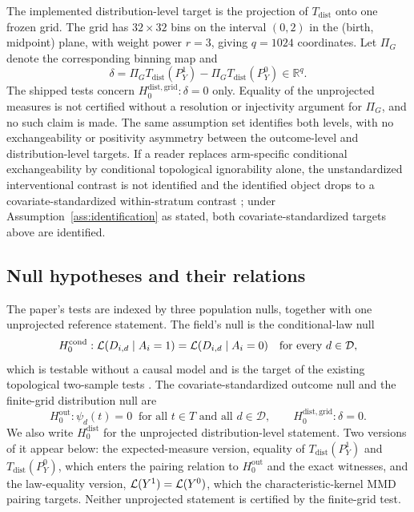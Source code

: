 The implemented distribution-level target is the projection of $T_{\mathrm{dist}}$ onto one frozen
grid. The grid has $32 \times 32$ bins on the interval $(0,2)$ in the (birth, midpoint) plane,
with weight power $r=3$, giving $q = 1024$ coordinates. Let $\Pi_G$ denote the corresponding
binning map and
\begin{equation}
\label{eq:delta}
\delta = \Pi_G T_{\mathrm{dist}}(P^1_Y) - \Pi_G T_{\mathrm{dist}}(P^0_Y) \in \mathbb R^q.
\end{equation}
The shipped tests concern $H_0^{\mathrm{dist,grid}} : \delta = 0$ only. Equality of the
unprojected measures is not certified without a resolution or injectivity argument for $\Pi_G$,
and no such claim is made. The same assumption set identifies both levels, with no exchangeability
or positivity asymmetry between the outcome-level and distribution-level targets. If a reader
replaces arm-specific conditional exchangeability by conditional topological ignorability alone,
the unstandardized interventional contrast is not identified and the identified object drops to a
covariate-standardized within-stratum contrast \cite{saki_faghihi_2026}; under Assumption~\ref{ass:identification} as
stated, both covariate-standardized targets above are identified.

\subsection{Null hypotheses and their relations}

The paper's tests are indexed by three population nulls, together with one unprojected reference statement. The field's null is the conditional-law null
\begin{equation}
H_0^{\mathrm{cond}} : \mathcal{L}(D_{i,d} \mid A_i=1) = \mathcal{L}(D_{i,d} \mid A_i=0)
\quad \text{for every } d \in \mathcal D,
\end{equation}
which is testable without a causal model and is the target of the existing topological two-sample
tests
\cite{robinson_turner_2017,kwitt_neurips_2015,han_kim_kim_2026,murris_strand_2026,moon_lazar_2023,dubey_muller_2019}.
The covariate-standardized outcome null and the finite-grid distribution null are
\begin{equation}
H_0^{\mathrm{out}} : \psi_d(t) = 0 \ \text{ for all } t \in T \text{ and all } d \in \mathcal D,
\qquad
H_0^{\mathrm{dist,grid}} : \delta = 0.
\end{equation}
We also write $H_0^{\mathrm{dist}}$ for the unprojected distribution-level statement. Two versions of it appear below: the expected-measure version, equality of $T_{\mathrm{dist}}(P^1_Y)$ and $T_{\mathrm{dist}}(P^0_Y)$, which enters the pairing relation to $H_0^{\mathrm{out}}$ and the exact witnesses, and the law-equality version, $\mathcal{L}(Y^1)=\mathcal{L}(Y^0)$, which the characteristic-kernel MMD pairing targets. Neither unprojected statement is certified by the finite-grid test.

